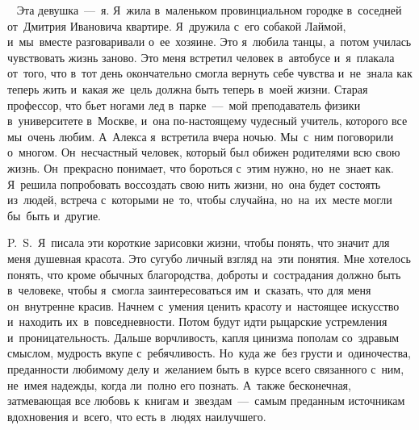 ~
Эта девушка~---~я.
Я~жила в~маленьком провинциальном городке в~соседней от~Дмитрия Ивановича квартире.
Я~дружила с~его собакой Лаймой, и~мы~вместе разговаривали о~ее~хозяине.
Это я~любила танцы, а~потом училась чувствовать жизнь заново.
Это меня встретил человек в~автобусе и~я~плакала от~того, что в~тот день окончательно смогла вернуть себе чувства и~не~знала как теперь жить и~какая же~цель должна быть теперь в~моей жизни.
Старая профессор, что бьет ногами лед в~парке~---~мой преподаватель физики в~университете в~Москве, и~она по-настоящему чудесный учитель, которого все мы~очень любим.
А~Алекса я~встретила вчера ночью.
Мы~с~ним поговорили о~многом.
Он~несчастный человек, который был обижен родителями всю свою жизнь.
Он~прекрасно понимает, что бороться с~этим нужно, но~не~знает как.
Я~решила попробовать воссоздать свою нить жизни, но~она будет состоять из~людей, встреча с~которыми не~то, чтобы случайна, но~на~их~месте могли бы~быть и~другие.
 
P.~S.~Я~писала эти короткие зарисовки жизни, чтобы понять, что значит для меня душевная красота.
Это сугубо личный взгляд на~эти понятия.
Мне хотелось понять, что кроме обычных благородства, доброты и~сострадания должно быть в~человеке, чтобы я~смогла заинтересоваться им~и~сказать, что для меня он~внутренне красив.
Начнем с~умения ценить красоту и~настоящее искусство и~находить их~в~повседневности.
Потом будут идти рыцарские устремления и~проницательность.
Дальше ворчливость, капля цинизма пополам со~здравым смыслом, мудрость вкупе с~ребячливость.
Но~куда же~без грусти и~одиночества, преданности любимому делу и~желанием быть в~курсе всего связанного с~ним, не~имея надежды, когда ли~полно его познать.
А~также бесконечная, затмевающая все любовь к~книгам и~звездам~---~самым преданным источникам вдохновения и~всего, что есть в~людях наилучшего.
 
